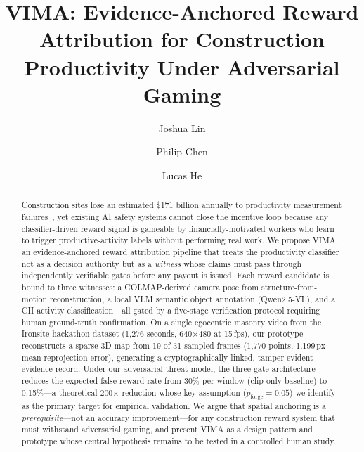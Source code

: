 \documentclass[sigconf,nonacm]{acmart}
\begin{document}
\title{VIMA: Evidence-Anchored Reward Attribution for Construction Productivity Under Adversarial Gaming}

\author{Joshua Lin}

\author{Philip Chen}

\author{Lucas He}

\begin{abstract}
Construction sites lose an estimated \$171 billion annually to productivity measurement failures~\cite{libertymutual2023}, yet existing AI safety systems cannot close the incentive loop because any classifier-driven reward signal is gameable by financially-motivated workers who learn to trigger productive-activity labels without performing real work.
We propose VIMA, an evidence-anchored reward attribution pipeline that treats the productivity classifier not as a decision authority but as a \emph{witness} whose claims must pass through independently verifiable gates before any payout is issued.
Each reward candidate is bound to three witnesses: a COLMAP-derived camera pose from structure-from-motion reconstruction, a local VLM semantic object annotation (Qwen2.5-VL), and a CII activity classification---all gated by a five-stage verification protocol requiring human ground-truth confirmation.
On a single egocentric masonry video from the Ironsite hackathon dataset (1,276 seconds, 640$\times$480 at 15\,fps), our prototype reconstructs a sparse 3D map from 19 of 31 sampled frames (1,770 points, 1.199\,px mean reprojection error), generating a cryptographically linked, tamper-evident evidence record.
Under our adversarial threat model, the three-gate architecture reduces the expected false reward rate from 30\% per window (clip-only baseline) to 0.15\%---a theoretical 200$\times$ reduction whose key assumption ($p_{\mathrm{forge}} = 0.05$) we identify as the primary target for empirical validation.
We argue that spatial anchoring is a \emph{prerequisite}---not an accuracy improvement---for any construction reward system that must withstand adversarial gaming, and present VIMA as a design pattern and prototype whose central hypothesis remains to be tested in a controlled human study.
\end{abstract}
\end{document}
